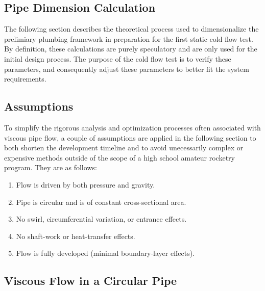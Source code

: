 \documentclass[9pt]{article} %
\numberwithin{equation}{section} %
\begin{document}
\begin{multicols}{2}
\section{Pipe Dimension Calculation}

The following section describes the theoretical process used to dimensionalize the prelimiary plumbing framework in preparation for the first static cold flow test. By definition, these calculations are purely speculatory and are only used for the initial design process. The purpose of the cold flow test is to verify these parameters, and consequently adjust these parameters to better fit the system requirements.

\subsection{Assumptions} \label{sec:assumptions}

To simplify the rigorous analysis and optimization processes often associated with viscous pipe flow, a couple of assumptions are applied in the following section to both shorten the development timeline and to avoid unecessarily complex or expensive methods outside of the scope of a high school amateur rocketry program. They are as follows:
\begin{enumerate}
\item Flow is driven by both pressure and gravity.
\item Pipe is circular and is of constant cross-sectional area. \label{itm:constant-area}
\item No swirl, circumferential variation, or entrance effects.
\item No shaft-work or heat-transfer effects. \label{itm:heat-effects}
\item Flow is fully developed (minimal boundary-layer effects).

\end{enumerate}


\subsection{Viscous Flow in a Circular Pipe}


\end{multicols}
\end{document}
